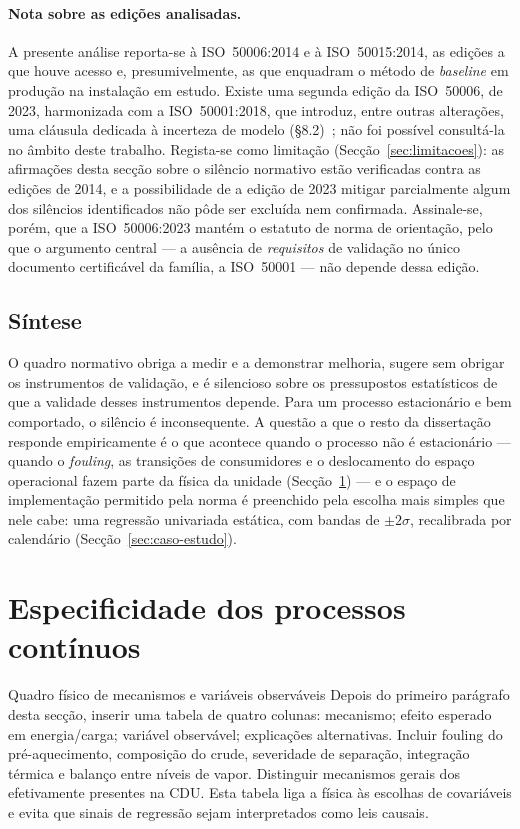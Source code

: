 \paragraph{Nota sobre as edições analisadas.} A presente análise reporta-se à ISO~50006:2014 e à ISO~50015:2014, as edições a que houve acesso e, presumivelmente, as que enquadram o método de \emph{baseline} em produção na instalação em estudo. Existe uma segunda edição da ISO~50006, de 2023, harmonizada com a ISO~50001:2018, que introduz, entre outras alterações, uma cláusula dedicada à incerteza de modelo (\S8.2)~\cite{ISO50006_2023}; não foi possível consultá-la no âmbito deste trabalho. Regista-se como limitação (Secção~\ref{sec:limitacoes}): as afirmações desta secção sobre o silêncio normativo estão verificadas contra as edições de 2014, e a possibilidade de a edição de 2023 mitigar parcialmente algum dos silêncios identificados não pôde ser excluída nem confirmada. Assinale-se, porém, que a ISO~50006:2023 mantém o estatuto de norma de orientação, pelo que o argumento central --- a ausência de \emph{requisitos} de validação no único documento certificável da família, a ISO~50001 --- não depende dessa edição.

\subsection{Síntese}
\label{sec:assimetria-sintese}

O quadro normativo obriga a medir e a demonstrar melhoria, sugere sem obrigar os instrumentos de validação, e é silencioso sobre os pressupostos estatísticos de que a validade desses instrumentos depende. Para um processo estacionário e bem comportado, o silêncio é inconsequente. A questão a que o resto da dissertação responde empiricamente é o que acontece quando o processo não é estacionário --- quando o \emph{fouling}, as transições de consumidores e o deslocamento do espaço operacional fazem parte da física da unidade (Secção~\ref{sec:processos-continuos}) --- e o espaço de implementação permitido pela norma é preenchido pela escolha mais simples que nele cabe: uma regressão univariada estática, com bandas de $\pm 2\sigma$, recalibrada por calendário (Secção~\ref{sec:caso-estudo}).

\section{Especificidade dos processos contínuos}
\label{sec:processos-continuos}
{Quadro físico de mecanismos e variáveis observáveis}
{Depois do primeiro parágrafo desta secção, inserir uma tabela de quatro
colunas: mecanismo; efeito esperado em energia/carga; variável observável;
explicações alternativas. Incluir fouling do pré-aquecimento, composição
do crude, severidade de separação, integração térmica e balanço entre
níveis de vapor. Distinguir mecanismos gerais dos efetivamente presentes
na CDU. Esta tabela liga a física às escolhas de covariáveis e evita
que sinais de regressão sejam interpretados como leis causais.}%

